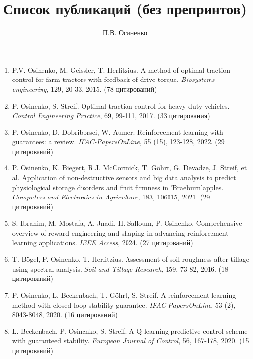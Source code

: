 \documentclass{article}
\begin{document}
\title{Список публикаций (без препринтов)}
\author{П.В. Осиненко}
\date{}
\maketitle

\begin{enumerate}

\item P.V. Osinenko, M. Geissler, T. Herlitzius. A method of optimal traction control for farm tractors with feedback of drive torque. \textit{Biosystems engineering}, 129, 20-33, 2015. (78 цитирований)

\item P. Osinenko, S. Streif. Optimal traction control for heavy-duty vehicles. \textit{Control Engineering Practice}, 69, 99-111, 2017. (33 цитирования)

\item P. Osinenko, D. Dobriborsci, W. Aumer. Reinforcement learning with guarantees: a review. \textit{IFAC-PapersOnLine}, 55 (15), 123-128, 2022. (29 цитирований)

\item P. Osinenko, K. Biegert, R.J. McCormick, T. Göhrt, G. Devadze, J. Streif, et al. Application of non-destructive sensors and big data analysis to predict physiological storage disorders and fruit firmness in 'Braeburn'apples. \textit{Computers and Electronics in Agriculture}, 183, 106015, 2021. (29 цитирований)

\item S. Ibrahim, M. Mostafa, A. Jnadi, H. Salloum, P. Osinenko. Comprehensive overview of reward engineering and shaping in advancing reinforcement learning applications. \textit{IEEE Access}, 2024. (27 цитирований)

\item T. Bögel, P. Osinenko, T. Herlitzius. Assessment of soil roughness after tillage using spectral analysis. \textit{Soil and Tillage Research}, 159, 73-82, 2016. (18 цитирований)

\item P. Osinenko, L. Beckenbach, T. Göhrt, S. Streif. A reinforcement learning method with closed-loop stability guarantee. \textit{IFAC-PapersOnLine}, 53 (2), 8043-8048, 2020. (16 цитирований)

\item L. Beckenbach, P. Osinenko, S. Streif. A Q-learning predictive control scheme with guaranteed stability. \textit{European Journal of Control}, 56, 167-178, 2020. (15 цитирований)


\end{enumerate}
\end{document}
